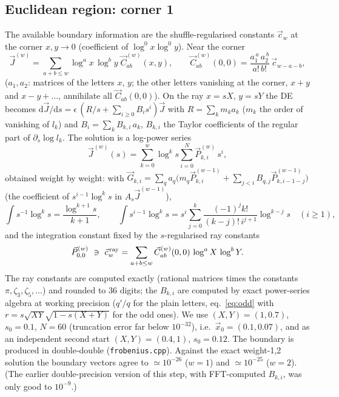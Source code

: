 \documentclass[11pt,a4paper]{article}
\newcommand{\eps}{\epsilon}
\begin{document}
\subsection{Euclidean region: corner 1}
The available boundary information are the shuffle-regularised constants $\vec c_w$ at the corner $x,y\to0$
(coefficient of $\log^0x\log^0y$).  Near the corner
\begin{equation}
 \vec J^{(w)}=\sum_{a+b\le w}\log^a x\,\log^b y\;\vec C^{(w)}_{ab}(x,y),\qquad
 \vec C^{(w)}_{ab}(0,0)=\frac{a_1^{\,a}\,a_2^{\,b}}{a!\,b!}\,\vec c_{w-a-b} ,
\end{equation}
($a_1,a_2$: matrices of the letters $x$, $y$; the other letters vanishing at the corner, $x+y$ and $x-y+\dots$,
annihilate all $\vec C_{ab}(0,0)$).  On the ray $x=sX$, $y=sY$ the DE becomes
$\mathrm d\vec J/\mathrm ds=\eps\,(R/s+\sum_{i\ge0}B_i s^i)\vec J$ with $R=\sum_k m_k a_k$ ($m_k$ the order of vanishing of
$l_k$) and $B_i=\sum_k B_{k,i}\,a_k$, $B_{k,i}$ the Taylor coefficients of the regular part of $\partial_s\log l_k$.
The solution is a log-power series
\begin{equation}
 \vec J^{(w)}(s)=\sum_{k=0}^{w}\log^k s\sum_{i=0}^{N}\vec P^{(w)}_{k,i}\,s^i ,
\end{equation}
obtained weight by weight: with $\vec G_{k,i}=\sum_q a_q\big(m_q\vec P^{(w-1)}_{k,i}+\sum_{j<i}B_{q,j}\vec P^{(w-1)}_{k,i-1-j}\big)$
(the coefficient of $s^{i-1}\log^k s$ in $A_s\vec J^{(w-1)}$),
\begin{equation}
 \int\! s^{-1}\log^k s=\frac{\log^{k+1}s}{k+1},\qquad
 \int\! s^{i-1}\log^k s=s^i\sum_{j=0}^{k}\frac{(-1)^j k!}{(k-j)!\,i^{j+1}}\log^{k-j}s\quad(i\ge1),
\end{equation}
and the integration constant fixed by the $s$-regularised ray constants
\begin{equation}
 \vec P^{(w)}_{0,0}\ \ni\ \vec c^{\,\rm ray}_w=\sum_{a+b\le w}\vec C^{(w)}_{ab}(0,0)\,\log^aX\,\log^bY .
\end{equation}
The ray constants are computed exactly (rational matrices times the constants $\pi,\zeta_3,\zeta_5,\dots$) and rounded
to 36 digits; the $B_{k,i}$ are computed by exact power-series algebra at working precision
($q'/q$ for the plain letters, eq.~\eqref{eq:odd} with $r=s\sqrt{XY}\sqrt{1-s(X+Y)}$ for the odd ones).
We use $(X,Y)=(1,0.7)$, $s_0=0.1$, $N=60$ (truncation error far below $10^{-32}$), i.e.\ $\vec x_0=(0.1,0.07)$, and as an
independent second start $(X,Y)=(0.4,1)$, $s_0=0.12$.  The boundary is produced in double-double
(\texttt{frobenius.cpp}).  Against the exact weight-1,2 solution the boundary vectors agree to
$\simeq10^{-26}$ ($w=1$) and $\simeq10^{-25}$ ($w=2$).
(The earlier double-precision version of this step, with FFT-computed $B_{k,i}$, was only good to $10^{-9}$.)
\end{document}

